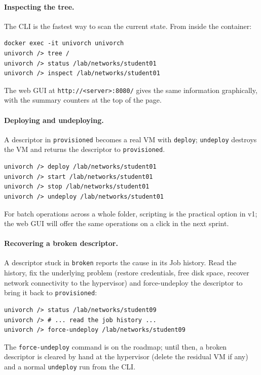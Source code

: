 \paragraph{Inspecting the tree.}
The CLI is the fastest way to scan the current state. From inside
the container:

\begin{verbatim}
docker exec -it univorch univorch
univorch /> tree /
univorch /> status /lab/networks/student01
univorch /> inspect /lab/networks/student01
\end{verbatim}

The web GUI at \texttt{http://<server>:8080/} gives the same
information graphically, with the summary counters at the top of
the page.

\paragraph{Deploying and undeploying.}
A descriptor in \texttt{provisioned} becomes a real VM with
\texttt{deploy}; \texttt{undeploy} destroys the VM and returns the
descriptor to \texttt{provisioned}.

\begin{verbatim}
univorch /> deploy /lab/networks/student01
univorch /> start /lab/networks/student01
univorch /> stop /lab/networks/student01
univorch /> undeploy /lab/networks/student01
\end{verbatim}

For batch operations across a whole folder, scripting is the
practical option in v1; the web GUI will offer the same operations
on a click in the next sprint.

\paragraph{Recovering a broken descriptor.}
A descriptor stuck in \texttt{broken} reports the cause in its
Job history. Read the history, fix the underlying problem
(restore credentials, free disk space, recover network
connectivity to the hypervisor) and force-undeploy the descriptor
to bring it back to \texttt{provisioned}:

\begin{verbatim}
univorch /> status /lab/networks/student09
univorch /> # ... read the job history ...
univorch /> force-undeploy /lab/networks/student09
\end{verbatim}

The \texttt{force-undeploy} command is on the roadmap; until then,
a broken descriptor is cleared by hand at the hypervisor (delete
the residual VM if any) and a normal \texttt{undeploy} run from
the CLI.

